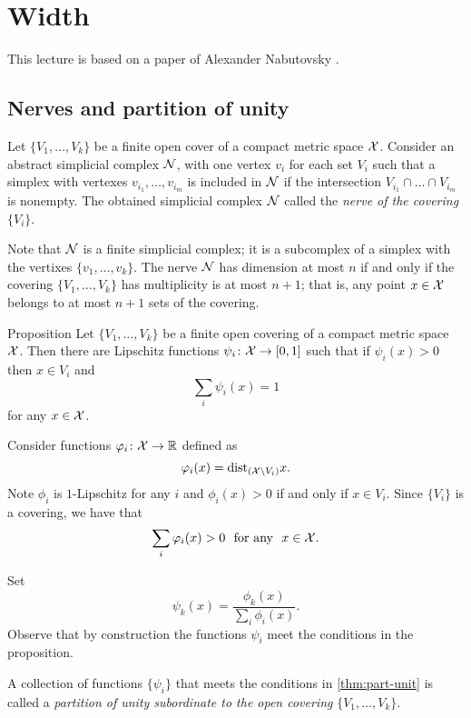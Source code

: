 \chapter{Width}

This lecture is based on a paper of Alexander Nabutovsky \cite{nabutovsky}.

\section{Nerves and partition of unity}

Let $\{V_1,\dots,V_k\}$ be a finite open cover of a compact metric space $\mathcal{X}$.
Consider an abstract simplicial complex $\mathcal{N}$, with one vertex $v_i$ for each set $V_i$ such that a simplex with vertexes $v_{i_1},\dots, v_{i_m}$ is included in $\mathcal{N}$ if 
the intersection $V_{i_1}\cap\dots\cap V_{i_m}$ is nonempty.
The obtained simplicial complex $\mathcal{N}$ called the \emph{nerve of the covering $\{V_i\}$}.

Note that $\mathcal{N}$ is a finite simplicial complex;
it is a subcomplex of a simplex with the vertixes $\{v_1,\dots,v_k\}$.
The nerve $\mathcal{N}$ has dimension at most $n$ if and only if the covering $\{V_1,\dots,V_k\}$ has multiplicity is at most $n+1$;
that is, any point $x\in\mathcal{X}$ belongs to
at most $n+1$ sets of the covering.

\begin{thm}{Proposition}\label{thm:part-unit}
 Let $\{V_1,\dots,V_k\}$ be a finite open covering of a compact metric space ${\mathcal{X}}$.
Then there are Lipschitz functions $\psi_i\:{\spc{X}}\z\to[0,1]$ such that
if $\psi_i(x)>0$ then $x\in V_i$ and
$$\sum_i\psi_i(x)=1$$
for any $x\in {\mathcal{X}}$.
\end{thm}

Consider functions $\varphi_i\colon{\mathcal{X}}\to\mathbb{R}$ defined as
$$\varphi_i(x)=\mathrm{dist}_{({\mathcal{X}}\backslash V_i)} x.$$
Note $\phi_i$ is $1$-Lipschitz
for any $i$
and $\phi_i(x)>0$ if and only if $x\in V_i$.
Since $\{V_i\}$ is a covering, we have that
$$\sum_i\varphi_i(x)>0\ \ \text{for any}\ \ x\in {\mathcal{X}}.$$

Set 
$$\psi_k(x)=\frac{\phi_k(x)}{\sum_i\phi_i(x)}.$$
Observe that by construction the functions $\psi_i$ meet the conditions in the proposition.
\qedsf

A collection of functions $\{\psi_i\}$ that meets the conditions in \ref{thm:part-unit} is called 
a \emph{partition of unity subordinate to the open covering} $\{V_1,\dots,V_k\}$.

